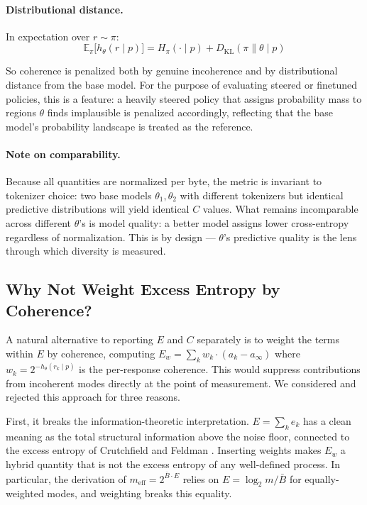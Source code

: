 \documentclass[11pt]{article}
\newcommand{\E}{\mathbb{E}}
\newcommand{\KL}{D_{\mathrm{KL}}}
\begin{document}
\paragraph{Distributional distance.} In expectation over $r \sim \pi$:
\begin{equation}
    \E_\pi\bigl[h_\theta(r \mid p)\bigr] = H_\pi(\cdot \mid p) + \KL(\pi \| \theta \mid p)
\end{equation}

So coherence is penalized both by genuine incoherence and by distributional distance from the base model. For the purpose of evaluating steered or finetuned policies, this is a feature: a heavily steered policy that assigns probability mass to regions $\theta$ finds implausible is penalized accordingly, reflecting that the base model's probability landscape is treated as the reference.

\paragraph{Note on comparability.} Because all quantities are normalized per byte, the metric is invariant to tokenizer choice: two base models $\theta_1, \theta_2$ with different tokenizers but identical predictive distributions will yield identical $C$ values. What remains incomparable across different $\theta$'s is model quality: a better model assigns lower cross-entropy regardless of normalization. This is by design --- $\theta$'s predictive quality is the lens through which diversity is measured.

\subsection{Why Not Weight Excess Entropy by Coherence?}\label{sec:why-not-weight}

A natural alternative to reporting $E$ and $C$ separately is to weight the terms within $E$ by coherence, computing $E_w = \sum_k w_k \cdot (a_k - a_\infty)$ where $w_k = 2^{-h_\theta(r_k \mid p)}$ is the per-response coherence. This would suppress contributions from incoherent modes directly at the point of measurement. We considered and rejected this approach for three reasons.

First, it breaks the information-theoretic interpretation. $E = \sum_k e_k$ has a clean meaning as the total structural information above the noise floor, connected to the excess entropy of Crutchfield and Feldman \citeyearpar{crutchfield2003regularities}. Inserting weights makes $E_w$ a hybrid quantity that is not the excess entropy of any well-defined process. In particular, the derivation of $m_{\mathrm{eff}} = 2^{\bar{B} \cdot E}$ relies on $E = \log_2 m / \bar{B}$ for equally-weighted modes, and weighting breaks this equality.
\end{document}
